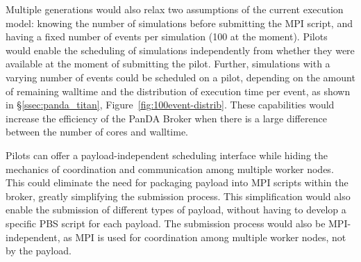  Multiple generations would also relax two assumptions of the
current execution model: knowing the number of simulations before submitting the
MPI script, and having a fixed number of events per simulation (100 at the
moment). Pilots would enable the scheduling of simulations independently from
whether they were available at the moment of submitting the pilot. Further,
simulations with a varying number of events could be scheduled on a pilot,
depending on the amount of remaining walltime and the distribution of execution
time per event, as shown in \S\ref{ssec:panda_titan},
Figure~\ref{fig:100event-distrib}. These capabilities would increase the
efficiency of the PanDA Broker when there is a large difference between the
number of cores and walltime.



Pilots can offer a payload-independent scheduling interface while hiding the
mechanics of coordination and communication among multiple worker nodes. This
could eliminate the need for packaging payload into MPI scripts within the
broker, greatly simplifying the submission process. This simplification would
also enable the submission of different types of payload, without having to
develop a specific PBS script for each payload. The submission process would
also be MPI-independent, as MPI is used for coordination among multiple worker
nodes, not by the payload. 

